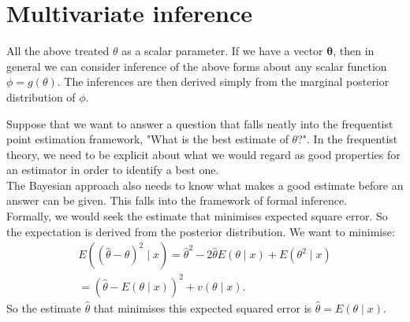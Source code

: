 \documentclass[lecture,12pt,]{pcms-l}
\numberwithin{section}{chapter}
\numberwithin{equation}{chapter}
\theoremstyle{plain}
\theoremstyle{definition}
\theoremstyle{definition}
\begin{document}
\section{Multivariate inference}
All the above treated $\theta$ as a scalar parameter. If we have a vector $\mathbf{\theta}$, then in general we can consider inference of the above forms about any scalar function $\phi = g(\theta)$. The inferences are then derived simply from the marginal posterior distribution of $\phi$.

Suppose that we want to answer a question that falls neatly into the frequentist point estimation framework, "What is the best estimate of $\theta$?". In the frequentist theory, we need to be explicit about what we would regard as good properties for an estimator in order to identify a best one. 
\\
The Bayesian approach also needs to know what makes a good estimate before an answer can be given. This falls into the framework of formal inference. 
\\
Formally, we would seek the estimate that minimises expected square error. So the expectation is derived from the posterior distribution. We want to minimise:
\begin{equation}
\begin{split}
E((\hat{\theta}-\theta)^2 \mid x)= \hat{\theta}^2 - 2 \hat{\theta}E(\theta \mid x)+E(\theta^2 \mid x)
\\
= (\hat{\theta}-E(\theta \mid x))^2 + v(\theta \mid x).
\end{split}
\end{equation}
So the estimate $\hat{\theta}$ that minimises this expected squared error is $\hat{\theta}=E(\theta \mid x)$.
\end{document}
